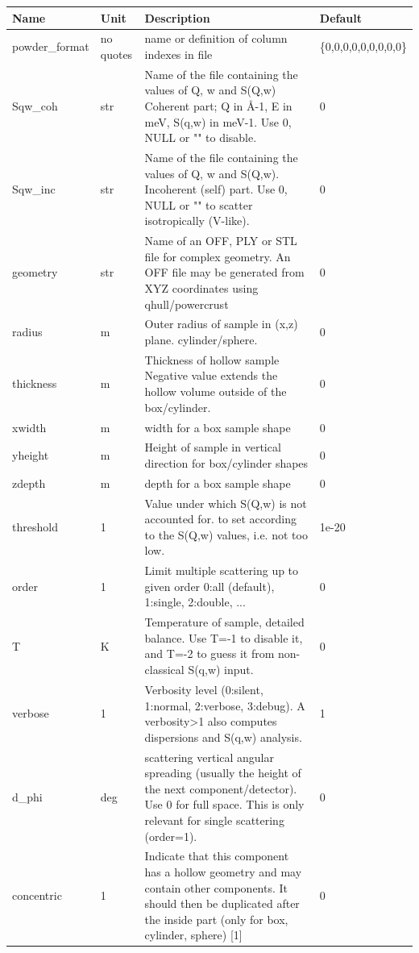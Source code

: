 \begin{longtable}{p{}p{}p{}p{}}
\toprule
\textbf{Name} & \textbf{Unit} & \textbf{Description} & \textbf{Default} \\
\midrule
\endhead
powder\_format & no quotes & name or definition of column indexes in file & \{0,0,0,0,0,0,0,0,0\} \\
Sqw\_coh & str & Name of the file containing the values of Q, w and S(Q,w) Coherent part; Q in \AA{}-1, E in meV, S(q,w) in meV-1. Use 0, NULL or "" to disable. & 0 \\
Sqw\_inc & str & Name of the file containing the values of Q, w and S(Q,w). Incoherent (self) part. Use 0, NULL or "" to scatter isotropically (V-like). & 0 \\
geometry & str & Name of an OFF, PLY or STL file for complex geometry. An OFF file may be generated from XYZ coordinates using qhull/powercrust & 0 \\
radius & m & Outer radius of sample in (x,z) plane. cylinder/sphere. & 0 \\
thickness & m & Thickness of hollow sample Negative value extends the hollow volume outside of the box/cylinder. & 0 \\
xwidth & m & width for a box sample shape & 0 \\
yheight & m & Height of sample in vertical direction for box/cylinder shapes & 0 \\
zdepth & m & depth for a box sample shape & 0 \\
threshold & 1 & Value under which S(Q,w) is not accounted for. to set according to the S(Q,w) values, i.e. not too low. & 1e-20 \\
order & 1 & Limit multiple scattering up to given order 0:all (default), 1:single, 2:double, ... & 0 \\
T & K & Temperature of sample, detailed balance. Use T=-1 to disable it, and T=-2 to guess it from non-classical S(q,w) input. & 0 \\
verbose & 1 & Verbosity level (0:silent, 1:normal, 2:verbose, 3:debug). A verbosity\textgreater{}1 also computes dispersions and S(q,w) analysis. & 1 \\
d\_phi & deg & scattering vertical angular spreading (usually the height of the next component/detector). Use 0 for full space. This is only relevant for single scattering (order=1). & 0 \\
concentric & 1 & Indicate that this component has a hollow geometry and may contain other components. It should then be duplicated after the inside part (only for box, cylinder, sphere) [1] & 0 \\

\end{longtable}
